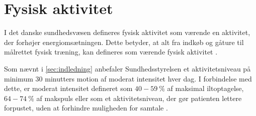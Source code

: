 \section{Fysisk aktivitet}

I det danske sundhedsvæsen defineres fysisk aktivitet som værende en aktivitet, der forhøjer energiomsætningen. Dette betyder, at alt fra indkøb og gåture til målrettet fysisk træning, kan defineres som værende fysisk aktivitet \citep{motionsraad2007, terkelsen2015}.

Som nævnt i \ref{sec:indledning} anbefaler Sundhedsstyrelsen et aktivitetsniveau på minimum 30 minutters motion af moderat intensitet hver dag. I forbindelse med dette, er moderat intensitet defineret som $40-59~\%$ af maksimal iltoptagelse, $64-74~\%$ af makspuls eller som et aktivitetsniveau, der gør patienten lettere forpustet, uden at forhindre muligheden for samtale \citep{motionsraad2007}. 
